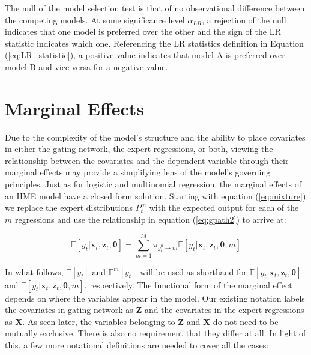 \documentclass[12pt]{article}
\newcommand{\gateprod}[2]{\pi_{#1 \longrightarrow #2}}
\newcommand{\Eym}{\mathbb{E}^{m} \left[ y_{t} \right]}
\theoremstyle{definition}
\begin{document}
The null of the model selection test is that of no observational difference
between the competing models. At some significance level $\alpha_{LR}$,
a rejection of the null indicates that one model is preferred over the other
and the sign of the LR statistic indicates which one. Referencing the LR
statistics definition in Equation (\ref{eq:LR_statistic}), a positive 
value indicates that model A is preferred over model B and vice-versa for
a negative value.


\section{Marginal Effects} \label{sec:MarginalEffects}

Due to the complexity of the model's structure and the ability to 
place covariates in either the gating network, the expert regressions,
or both, viewing the relationship between the covariates and the dependent
variable through their marginal effects may provide a simplifying lens of the 
model's governing principles. Just as for logistic and multinomial regression,
the marginal effects of an HME model have a closed form solution. Starting
with equation (\ref{eq:mixture}) we replace the expert distributions
$P^{m}_{t}$ with the expected output for each of the $m$ regressions and use
the relationship in equation (\ref{eq:gpath2}) to arrive at: 

\begin{equation} \label{eq:mixture2}
  \mathbb{E} \left[ y_{t} | \boldsymbol{x}_{t}, \boldsymbol{z}_{t}, \boldsymbol{\theta} \right] = \sum_{m=1}^{M} \gateprod{g^{0}_{t}}{m} \mathbb{E} \left[ y_{t} | \boldsymbol{x}_{t}, \boldsymbol{z}_{t}, \boldsymbol{\theta}, m \right]
\end{equation}

In what follows, $\mathbb{E} \left[y_{t}\right]$ and $\Eym$ will be used as shorthand
for $\mathbb{E} \left[ y_{t} | \boldsymbol{x}_{t}, \boldsymbol{z}_{t}, \boldsymbol{\theta} \right]$
and $\mathbb{E} \left[ y_{t} | \boldsymbol{x}_{t}, \boldsymbol{z}_{t}, \boldsymbol{\theta}, m \right]$,
respectively. The functional form of the marginal effect depends on where the variables
appear in the model. Our existing notation labels the covariates in gating
network as $\boldsymbol{Z}$ and the covariates in the expert regressions 
as $\boldsymbol{X}$. As seen later, the variables belonging to
$\boldsymbol{Z}$ and $\boldsymbol{X}$ do not need to be mutually
exclusive. There is also no requirement that they differ at all.
In light of this, a few more notational definitions are needed to cover
all the cases:
\end{document}
